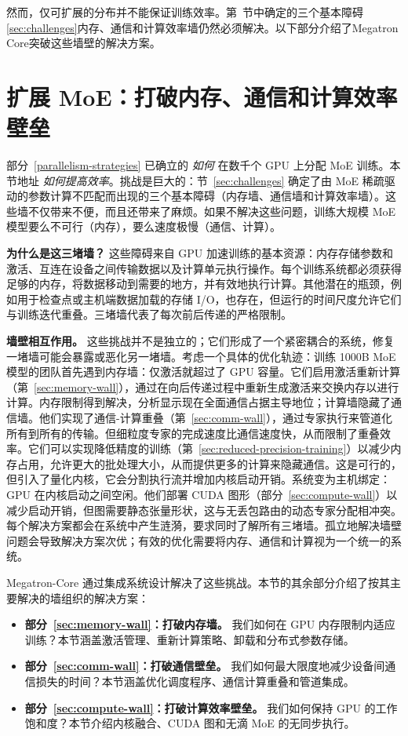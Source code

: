 \documentclass[10pt,logo,copyright]{nvidiatechreport_zh}
\begin{document}
然而，仅可扩展的分布并不能保证训练效率。第~节中确定的三个基本障碍\ref{sec:challenges}内存、通信和计算效率墙仍然必须解决。以下部分介绍了Megatron Core突破这些墙壁的解决方案。

\section{扩展 MoE：打破内存、通信和计算效率壁垒}\label{key-features-optimizations}

部分~\ref{parallelism-strategies} 已确立的 \emph{如何} 在数千个 GPU 上分配 MoE 训练。本节地址 \emph{如何提高效率}。挑战是巨大的：节~\ref{sec:challenges} 确定了由 MoE 稀疏驱动的参数计算不匹配而出现的三个基本障碍（内存墙、通信墙和计算效率墙）。这些墙不仅带来不便，而且还带来了麻烦。如果不解决这些问题，训练大规模 MoE 模型要么不可行（内存），要么速度极慢（通信、计算）。

\textbf{为什么是这三堵墙？} 这些障碍来自 GPU 加速训练的基本资源：内存存储参数和激活、互连在设备之间传输数据以及计算单元执行操作。每个训练系统都必须获得足够的内存，将数据移动到需要的地方，并有效地执行计算。其他潜在的瓶颈，例如用于检查点或主机端数据加载的存储 I/O，也存在，但运行的时间尺度允许它们与训练迭代重叠。三堵墙代表了每次前后传递的严格限制。

\textbf{墙壁相互作用。} 这些挑战并不是独立的；它们形成了一个紧密耦合的系统，修复一堵墙可能会暴露或恶化另一堵墙。考虑一个具体的优化轨迹：训练 1000B MoE 模型的团队首先遇到内存墙：仅激活就超过了 GPU 容量。它们启用激活重新计算（第~\ref{sec:memory-wall}），通过在向后传递过程中重新生成激活来交换内存以进行计算。内存限制得到解决，分析显示现在全面通信占据主导地位；计算墙隐藏了通信墙。他们实现了通信-计算重叠（第~\ref{sec:comm-wall}），通过专家执行来管道化所有到所有的传输。但细粒度专家的完成速度比通信速度快，从而限制了重叠效率。它们可以实现降低精度的训练（第~\ref{sec:reduced-precision-training}）以减少内存占用，允许更大的批处理大小，从而提供更多的计算来隐藏通信。这是可行的，但引入了量化内核，它会分割执行流并增加内核启动开销。系统变为主机绑定：GPU 在内核启动之间空闲。他们部署 CUDA 图形（部分~\ref{sec:compute-wall}）以减少启动开销，但图需要静态张量形状，这与无丢包路由的动态专家分配相冲突。每个解决方案都会在系统中产生涟漪，要求同时了解所有三堵墙。孤立地解决墙壁问题会导致解决方案次优；有效的优化需要将内存、通信和计算视为一个统一的系统。

Megatron-Core 通过集成系统设计解决了这些挑战。本节的其余部分介绍了按其主要解决的墙组织的解决方案：
\begin{itemize}
    \item \textbf{部分~\ref{sec:memory-wall}：打破内存墙。} 我们如何在 GPU 内存限制内适应训练？本节涵盖激活管理、重新计算策略、卸载和分布式参数存储。
    \item \textbf{部分~\ref{sec:comm-wall}：打破通信壁垒。} 我们如何最大限度地减少设备间通信损失的时间？本节涵盖优化调度程序、通信计算重叠和管道集成。
    \item \textbf{部分~\ref{sec:compute-wall}：打破计算效率壁垒。} 我们如何保持 GPU 的工作饱和度？本节介绍内核融合、CUDA 图和无滴 MoE 的无同步执行。
\end{itemize}
\end{document}
